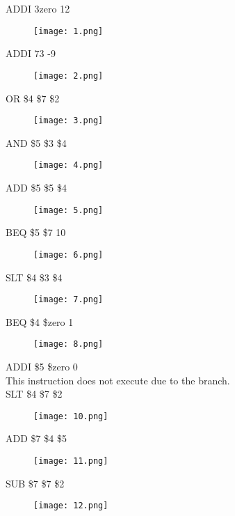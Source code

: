 \documentclass[paper=letter, fontsize=11pt]{scrartcl} %
\numberwithin{equation}{section}
\numberwithin{figure}{section}
\numberwithin{table}{section}
\begin{document}
ADDI $3 $zero 12
\begin{figure}[H]
	\centering
		\texttt{[image: 1.png]}
	\label{fig:tests}
\end{figure}
\pagebreak
ADDI $7 $3 -9	
\begin{figure}[H]
	\centering
		\texttt{[image: 2.png]}
	\label{fig:tests}
\end{figure}

OR    \$4 \$7 \$2		
\begin{figure}[H]
	\centering
		\texttt{[image: 3.png]}
	\label{fig:tests}
\end{figure}
\pagebreak
AND \$5 \$3 \$4		
\begin{figure}[H]
	\centering
		\texttt{[image: 4.png]}
	\label{fig:tests}
\end{figure}

ADD \$5 \$5 \$4		
\begin{figure}[H]
	\centering
		\texttt{[image: 5.png]}
	\label{fig:tests}
\end{figure}
\pagebreak
BEQ \$5 \$7 10		
\begin{figure}[H]
	\centering
		\texttt{[image: 6.png]}
	\label{fig:tests}
\end{figure}

SLT \$4 \$3 \$4	
\begin{figure}[H]
	\centering
		\texttt{[image: 7.png]}
	\label{fig:tests}
\end{figure}
\pagebreak
BEQ \$4 \$zero 1		
\begin{figure}[H]
	\centering
		\texttt{[image: 8.png]}
	\label{fig:tests}
\end{figure}

ADDI \$5 \$zero 0		\\
This instruction does not execute due to the branch. 
\\
\pagebreak
SLT \$4 \$7 \$2			
\begin{figure}[H]
	\centering
		\texttt{[image: 10.png]}
	\label{fig:tests}
\end{figure}

ADD \$7 \$4 \$5		
\begin{figure}[H]
	\centering
		\texttt{[image: 11.png]}
	\label{fig:tests}
\end{figure}
\pagebreak
SUB \$7 \$7 \$2		
\begin{figure}[H]
	\centering
		\texttt{[image: 12.png]}
	\label{fig:tests}
\end{figure}
\end{document}
